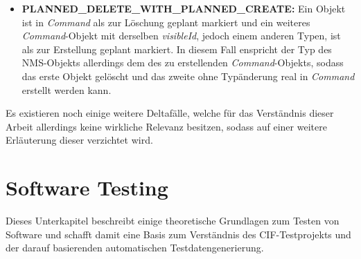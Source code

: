 \begin{itemize}
    \item \textbf{PLANNED\_DELETE\_WITH\_PLANNED\_CREATE:} Ein Objekt ist in \textit{Command} als zur Löschung geplant markiert und ein weiteres \textit{Command}-Objekt mit derselben \textit{visibleId}, jedoch einem anderen Typen, ist als zur Erstellung geplant markiert. In diesem Fall enspricht der Typ des \ac{NMS}-Objekts allerdings dem des zu erstellenden \textit{Command}-Objekts, sodass das erste Objekt gelöscht und das zweite ohne Typänderung real in \textit{Command} erstellt werden kann.
\end{itemize}

Es existieren noch einige weitere Deltafälle, welche für das Verständnis dieser Arbeit allerdings keine wirkliche Relevanz besitzen, sodass auf einer weitere Erläuterung dieser verzichtet wird.

\section{Software Testing}\label{sec:swtesting}
Dieses Unterkapitel beschreibt einige theoretische Grundlagen zum Testen von Software und schafft damit eine Basis zum Verständnis des \ac{CIF}-Testprojekts und der darauf basierenden automatischen Testdatengenerierung.

